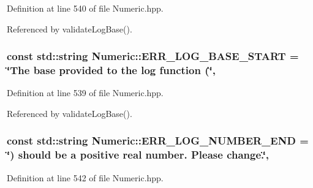 Definition at line 540 of file Numeric.\-hpp.



Referenced by validate\-Log\-Base().

\hypertarget{classmultiscale_1_1Numeric_a551052e6be615efea82ea046ba178010}{
\subsubsection[{E\-R\-R\-\_\-\-L\-O\-G\-\_\-\-B\-A\-S\-E\-\_\-\-S\-T\-A\-R\-T}]{\setlength{\rightskip}{0pt plus 5cm}const std\-::string Numeric\-::\-E\-R\-R\-\_\-\-L\-O\-G\-\_\-\-B\-A\-S\-E\-\_\-\-S\-T\-A\-R\-T = \char`\"{}The base provided to the {\bf log} function (\char`\"{}\hspace{0.3cm}{\ttfamily [static]}, {\ttfamily [private]}}}\label{classmultiscale_1_1Numeric_a551052e6be615efea82ea046ba178010}


Definition at line 539 of file Numeric.\-hpp.



Referenced by validate\-Log\-Base().

\hypertarget{classmultiscale_1_1Numeric_a2f61b82d42049e175a8d34cd75966c6c}{
\subsubsection[{E\-R\-R\-\_\-\-L\-O\-G\-\_\-\-N\-U\-M\-B\-E\-R\-\_\-\-E\-N\-D}]{\setlength{\rightskip}{0pt plus 5cm}const std\-::string Numeric\-::\-E\-R\-R\-\_\-\-L\-O\-G\-\_\-\-N\-U\-M\-B\-E\-R\-\_\-\-E\-N\-D = \char`\"{}) should be a positive real number. Please change.\char`\"{}\hspace{0.3cm}{\ttfamily [static]}, {\ttfamily [private]}}}\label{classmultiscale_1_1Numeric_a2f61b82d42049e175a8d34cd75966c6c}


Definition at line 542 of file Numeric.\-hpp.



